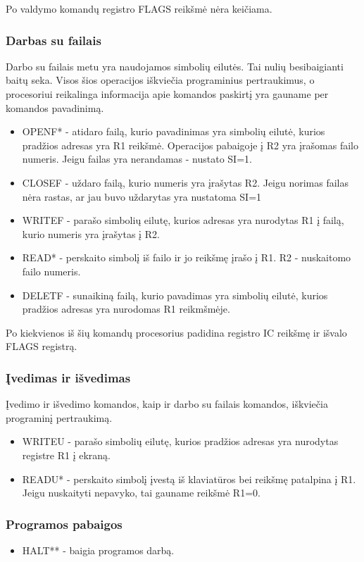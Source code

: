 \documentclass{VUMIFInfKursinis}
\begin{document}
Po valdymo komandų registro FLAGS reikšmė nėra keičiama.

\subsubsection{Darbas su failais}
Darbo su failais metu yra naudojamos simbolių eilutės. Tai nulių besibaigianti baitų seka. Visos šios operacijos iškviečia programinius pertraukimus, o procesoriui reikalinga informacija apie komandos paskirtį yra gauname per komandos pavadinimą.
\begin{itemize}
	\item OPENF* - atidaro failą, kurio pavadinimas yra simbolių eilutė, kurios pradžios adresas yra R1 reikšmė. Operacijos pabaigoje į R2 yra įrašomas failo numeris. Jeigu failas yra nerandamas - nustato SI=1.
	\item CLOSEF - uždaro failą, kurio numeris yra įrašytas  R2. Jeigu norimas failas nėra rastas, ar jau buvo uždarytas yra nustatoma SI=1
	\item WRITEF - parašo simbolių eilutę, kurios adresas yra nurodytas R1 į failą, kurio numeris yra įrašytas į R2.
	\item READ* - perskaito simbolį iš failo ir jo reikšmę įrašo į R1. R2 - nuskaitomo failo numeris.
	\item DELETF - sunaikiną failą, kurio pavadimas yra simbolių eilutė, kurios pradžios adresas yra nurodomas R1 reikmšmėje.
\end{itemize}

Po kiekvienos iš šių komandų procesorius padidina registro IC reikšmę ir išvalo FLAGS registrą.

\subsubsection{Įvedimas ir išvedimas}
Įvedimo ir išvedimo komandos, kaip ir darbo su failais komandos, iškviečia programinį pertraukimą.
\begin{itemize}
	\item WRITEU - parašo simbolių eilutę, kurios pradžios adresas yra nurodytas registre R1 į ekraną.
	\item READU* - perskaito simbolį įvestą iš klaviatūros bei reikšmę patalpina į R1. Jeigu nuskaityti nepavyko, tai gauname reikšmė R1=0.
\end{itemize}

\subsubsection{Programos pabaigos}
\begin{itemize}
	\item HALT** - baigia programos darbą.
\end{itemize}
\end{document}
